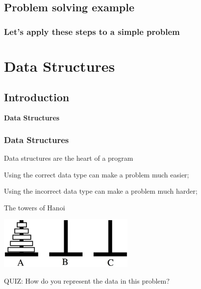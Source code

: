 \documentclass{beamer}
\begin{document}
\subsection{Problem solving example}
\begin{frame}
  \frametitle{Let's apply these steps to a simple problem}
\end{frame}


\section{Data Structures}
\subsection{Introduction}

\begin{frame}
  \begin{center}
    {\bf Data Structures}
  \end{center}
\end{frame}

\begin{frame}
  \frametitle{Data Structures}

  \begin{block}{Data structures are the heart of a program}
    \begin{itemize}
      {\small
      \item Using the correct data type can make a problem much easier;
      \item Using the incorrect data type can make a problem much harder;
      }
    \end{itemize}
  \end{block}

  \begin{block}{The towers of Hanoi}
    \begin{center}
    \includegraphics[width=0.5\textwidth]{img/hanoi}
    \end{center}
    \medskip
    QUIZ: How do you represent the data in this problem? 
  \end{block}
\end{frame}
\end{document}

